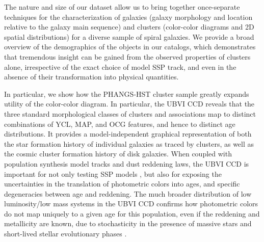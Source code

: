 \documentclass[linenumbers]{aastex63}
\begin{document}
The nature and size of our dataset allow us to bring together once-separate techniques for the characterization of galaxies (galaxy morphology and location relative to the galaxy main sequence) and clusters (color-color diagrams and 2D spatial distributions) for a diverse sample of spiral galaxies.  We provide a broad overview of the demographics of the objects in our catalogs, which demonstrates that tremendous insight can be gained from the observed properties of clusters alone, irrespective of the exact choice of model SSP track, and even in the absence of their transformation into physical quantities.  

In particular, we show how the PHANGS-HST cluster sample greatly expands utility of the color-color diagram.  In particular, the UBVI CCD reveals that the three standard morphological classes of clusters and associations map to distinct combinations of YCL, MAP, and OCG features, and hence to distinct age distributions.  It provides a model-independent graphical representation of both the star formation history of individual galaxies as traced by clusters, as well as the cosmic cluster formation history of disk galaxies.  When coupled with population synthesis model tracks and dust reddening laws, the UBVI CCD is important for not only testing SSP models \citep[e.g.,][]{larsen_young_1999, bruzual_stellar_2003, vazquez_optimization_2005, maraston_evolutionary_1998}, but also for exposing the uncertainties in the translation of photometric colors into ages, and specific degeneracies between age and reddening.  The much broader distribution of low luminosity/low mass systems in the UBVI CCD confirms how photometric colors do not map uniquely to a given age for this population, even if the reddening and metallicity are known, due to stochasticity in the presence of massive stars and short-lived stellar evolutionary phases \citep[e.g.][]{fouesneau_accounting_2010, silva-villa_star_2011,de_meulenaer_deriving_2013,krumholz_star_2015, OD2022}.
\end{document}
